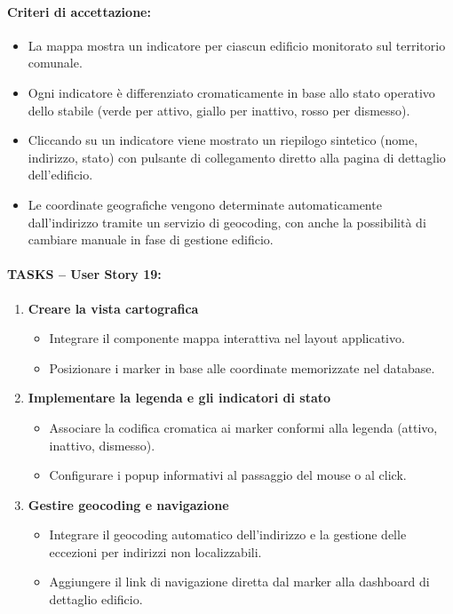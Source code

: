 \paragraph*{Criteri di accettazione:}
\begin{itemize}
    \item La mappa mostra un indicatore per ciascun edificio monitorato sul territorio comunale.
    \item Ogni indicatore è differenziato cromaticamente in base allo stato operativo dello stabile (verde per attivo, giallo per inattivo, rosso per dismesso).
    \item Cliccando su un indicatore viene mostrato un riepilogo sintetico (nome, indirizzo, stato) con pulsante di collegamento diretto alla pagina di dettaglio dell'edificio.
    \item Le coordinate geografiche vengono determinate automaticamente dall'indirizzo tramite un servizio di geocoding, con anche la possibilità di cambiare manuale in fase di gestione edificio.
\end{itemize}

\paragraph*{TASKS – User Story 19:}
\begin{enumerate}
    \item \textbf{Creare la vista cartografica}
    \begin{itemize}
        \item Integrare il componente mappa interattiva nel layout applicativo.
        \item Posizionare i marker in base alle coordinate memorizzate nel database.
    \end{itemize}
    \item \textbf{Implementare la legenda e gli indicatori di stato}
    \begin{itemize}
        \item Associare la codifica cromatica ai marker conformi alla legenda (attivo, inattivo, dismesso).
        \item Configurare i popup informativi al passaggio del mouse o al click.
    \end{itemize}
    \item \textbf{Gestire geocoding e navigazione}
    \begin{itemize}
        \item Integrare il geocoding automatico dell'indirizzo e la gestione delle eccezioni per indirizzi non localizzabili.
        \item Aggiungere il link di navigazione diretta dal marker alla dashboard di dettaglio edificio.
    \end{itemize}
\end{enumerate}

